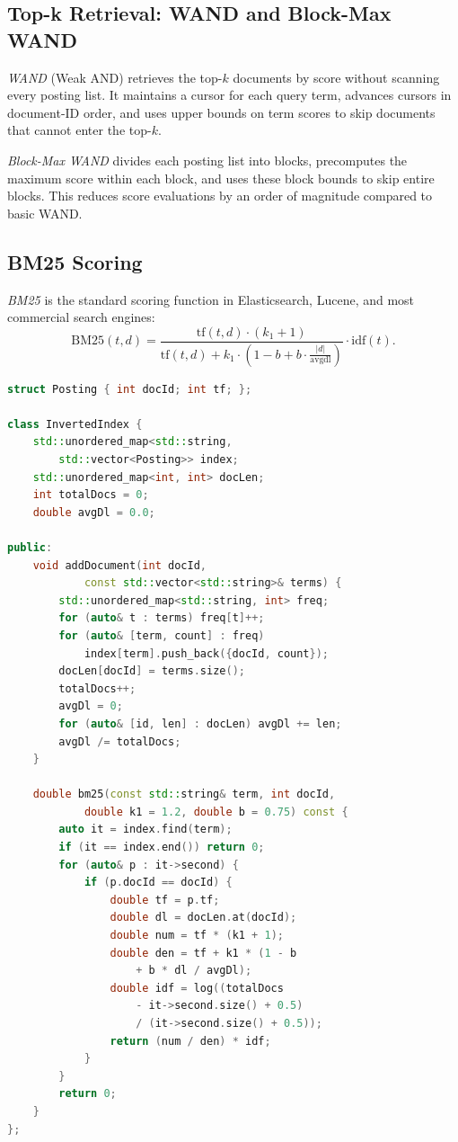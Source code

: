 \subsection{Top-k Retrieval: WAND and Block-Max WAND}

\emph{WAND} (Weak AND) retrieves the top-$k$ documents by score without scanning every posting list. It maintains a cursor for each query term, advances cursors in document-ID order, and uses upper bounds on term scores to skip documents that cannot enter the top-$k$.

\emph{Block-Max WAND} divides each posting list into blocks, precomputes the maximum score within each block, and uses these block bounds to skip entire blocks. This reduces score evaluations by an order of magnitude compared to basic WAND.

\subsection{BM25 Scoring}

\emph{BM25} is the standard scoring function in Elasticsearch, Lucene, and most commercial search engines:
\[
  \text{BM25}(t, d) = \frac{\text{tf}(t,d) \cdot (k_1 + 1)}
  {\text{tf}(t,d) + k_1 \cdot \left(1 - b + b \cdot \frac{|d|}{\text{avgdl}}\right)}
  \cdot \text{idf}(t).
\]

\begin{lstlisting}[language=C++]
struct Posting { int docId; int tf; };

class InvertedIndex {
    std::unordered_map<std::string,
        std::vector<Posting>> index;
    std::unordered_map<int, int> docLen;
    int totalDocs = 0;
    double avgDl = 0.0;

public:
    void addDocument(int docId,
            const std::vector<std::string>& terms) {
        std::unordered_map<std::string, int> freq;
        for (auto& t : terms) freq[t]++;
        for (auto& [term, count] : freq)
            index[term].push_back({docId, count});
        docLen[docId] = terms.size();
        totalDocs++;
        avgDl = 0;
        for (auto& [id, len] : docLen) avgDl += len;
        avgDl /= totalDocs;
    }

    double bm25(const std::string& term, int docId,
            double k1 = 1.2, double b = 0.75) const {
        auto it = index.find(term);
        if (it == index.end()) return 0;
        for (auto& p : it->second) {
            if (p.docId == docId) {
                double tf = p.tf;
                double dl = docLen.at(docId);
                double num = tf * (k1 + 1);
                double den = tf + k1 * (1 - b
                    + b * dl / avgDl);
                double idf = log((totalDocs
                    - it->second.size() + 0.5)
                    / (it->second.size() + 0.5));
                return (num / den) * idf;
            }
        }
        return 0;
    }
};
\end{lstlisting}

